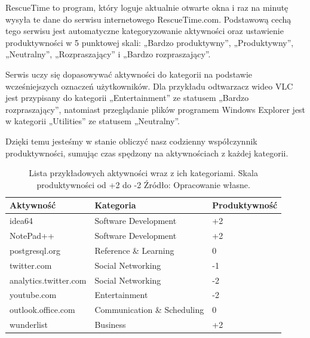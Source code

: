 \documentclass[brudnopis]{xmgr}
\begin{document}

        RescueTime to program, który loguje aktualnie otwarte okna
        i raz na minutę wysyła te dane do serwisu internetowego RescueTime.com.
        Podstawową cechą tego serwisu jest automatyczne kategoryzowanie aktywności oraz ustawienie produktywności w 5 punktowej skali:
        „Bardzo produktywny”, „Produktywny”, „Neutralny”, „Rozpraszający” i „Bardzo rozpraszający”.

        Serwis uczy się dopasowywać aktywności do kategorii na podstawie wcześniejszych oznaczeń użytkowników.
        Dla przykładu odtwarzacz wideo VLC jest przypisany do kategorii „Entertainment” ze statusem „Bardzo rozpraszający”,
        natomiast przeglądanie plików programem Windows Explorer jest w kategorii „Utilities” ze statusem „Neutralny”.

        Dzięki temu jesteśmy w stanie obliczyć nasz codzienny współczynnik produktywności,
        sumując czas spędzony na aktywnościach z każdej kategorii.

        \begin{table}[]
        \centering
        \begin{tabular}{lll}
        \hline
        \multicolumn{1}{l|}{Aktywność} & \multicolumn{1}{l|}{Kategoria} & Produktywność \\ \hline
        idea64                         & Software Development           & +2            \\
        NotePad++                      & Software Development           & +2            \\
        postgresql.org                 & Reference \& Learning          & 0             \\
        twitter.com                    & Social Networking              & -1            \\
        analytics.twitter.com          & Social Networking              & -2            \\
        youtube.com                    & Entertainment                  & -2            \\
        outlook.office.com             & Communication \& Scheduling    & 0             \\
        wunderlist                     & Business                       & +2
        \end{tabular}
        \caption{
            Lista przykładowych aktywności wraz z ich kategoriami. Skala produktywności od +2 do -2
            \newline Źródło: Opracowanie własne.
        }
        \label{RescueTime --- lista przykładowych aktywności}
        \end{table}
\end{document}

